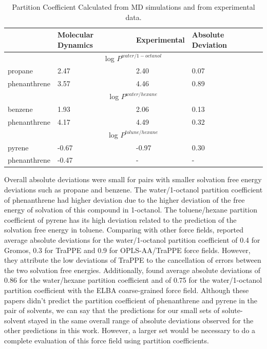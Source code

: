 \begin{table}[H]
    \centering
    \caption{Partition Coefficient Calculated from MD simulations and from experimental data.}
    \label{tbl:part}
    \begin{tabular}{llll}
        \hline
         & {Molecular Dynamics} & {Experimental}& Absolute Deviation\\
       \hline
       \multicolumn{4}{c}{log $P^{water/1-octanol}$} \\
           \hline
       propane &2.47  &  2.40 & 0.07\\
       phenanthrene &3.57  & 4.46 & 0.89\\
       \hline
       \multicolumn{4}{c}{log $P^{water/hexane}$} \\
           \hline
       benzene &1.93  &  2.06 & 0.13\\
       phenanthrene &4.17  & 4.49 & 0.32 \\
       \hline
       \multicolumn{4}{c}{log $P^{tolune/hexane}$} \\
           \hline 
       pyrene &-0.67  &  -0.97 & 0.30\\
       phenanthrene &-0.47  & - & - \\ 
           \hline     
    \end{tabular}
    
\end{table}

Overall absolute deviations were small for pairs with smaller solvation free energy deviations such as propane and benzene. The water/1-octanol partition coefficient of phenanthrene had higher deviation due to the higher deviation of the free energy of solvation of this compound in 1-octanol. The toluene/hexane partition coefficient of pyrene has its high deviation related to the prediction of the solvation free energy in toluene. Comparing with other force fields,  reported average absolute deviations for the water/1-octanol partition coefficient of 0.4 for Gromos, 0.3 for TraPPE and 0.9 for OPLS-AA/TraPPE force fields. However, they attribute the low deviations of TraPPE to the cancellation of errors between the two solvation free energies. Additionally,  found average absolute deviations of 0.86 for the water/hexane partition coefficient and of 0.75 for the water/1-octanol partition coefficient with the ELBA coarse-grained force field. Although these papers didn't predict the partition coefficient of phenanthrene and pyrene in the pair of solvents, we can say that the predictions for our small sets of solute-solvent stayed in the same overall range of absolute deviations observed for the other predictions in this work. However, a larger set would be necessary to do a complete evaluation of this force field using partition coefficients. 